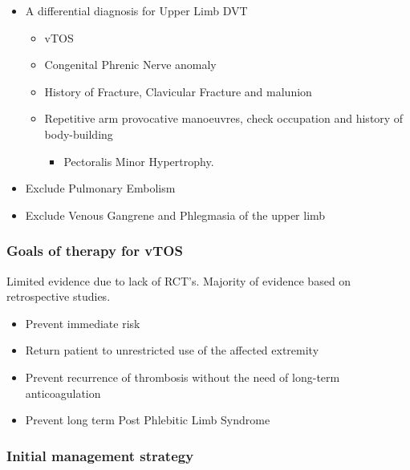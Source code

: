 \documentclass[
]{book}
\providecommand{\tightlist}{%
  \setlength{\itemsep}{0pt}\setlength{\parskip}{0pt}}
\begin{document}
\begin{itemize}
\item
  A differential diagnosis for Upper Limb DVT

  \begin{itemize}
  \item
    vTOS
  \item
    Congenital Phrenic Nerve anomaly
  \item
    History of Fracture, Clavicular Fracture and malunion
  \item
    Repetitive arm provocative manoeuvres, check occupation and
    history of body-building

    \begin{itemize}
    \tightlist
    \item
      Pectoralis Minor Hypertrophy.
    \end{itemize}
  \end{itemize}
\item
  Exclude Pulmonary Embolism~
\item
  Exclude Venous Gangrene and Phlegmasia of the upper limb
\end{itemize}

\hypertarget{goals-of-therapy-for-vtos}{%
\subsubsection{Goals of therapy for vTOS}\label{goals-of-therapy-for-vtos}}

Limited evidence due to lack of RCT's. Majority of evidence based on
retrospective studies.~

\begin{itemize}
\item
  Prevent immediate risk~
\item
  Return patient to unrestricted use of the affected extremity
\item
  Prevent recurrence of thrombosis without the need of long-term
  anticoagulation
\item
  Prevent long term Post Phlebitic Limb Syndrome
\end{itemize}

\hypertarget{initial-management-strategy}{%
\subsubsection{Initial management strategy}\label{initial-management-strategy}}
\end{document}
